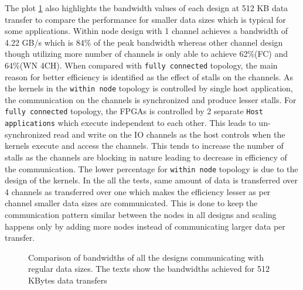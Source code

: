 The plot \ref{plot:allreg} also highlights the bandwidth values
of each design at 512 KB data transfer to compare the performance for smaller data sizes which is typical
for some applications. Within node design with 1 channel achieves a bandwidth of 4.22 GB/s which is 84\%
of the peak bandwidth whereas other channel design though utilizing more number of channels is only able
to achieve 62\%(FC) and 64\%(WN 4CH). When compared with \texttt{fully connected} topology, the main reason
for better efficiency is identified as the effect of stalls on the channels. As the kernels in the
\texttt{within node} topology is controlled by single host application, the communication on the channels is
synchronized and produce lesser stalls. For \texttt{fully connected} topology, the FPGAs is controlled
by 2 separate \texttt{Host applications} which execute independent to each other. This leads to un-synchronized
read and write on the IO channels as the host controls when the kernels execute and access the channels.
This tends to increase the number of stalls as the channels are blocking in nature leading to decrease in
efficiency of the communication. The lower percentage for \texttt{within node} topology is due to the design of the
kernels. In the all the tests, same amount of data is transferred over 4 channels as transferred
over one which makes the efficiency lesser as per channel smaller data sizes are communicated. This
is done to keep the communication pattern similar between the nodes in all designs and scaling
happens only by adding more nodes instead of communicating larger data per transfer.

\begin{figure}[ht]
    \centering
    \scalebox{0.8}{}
    \caption{Comparison of bandwidths of all the designs communicating with regular data sizes.
    The texts show the bandwidths achieved for 512 KBytes data transfers}
    \label{plot:allreg}
\end{figure}

